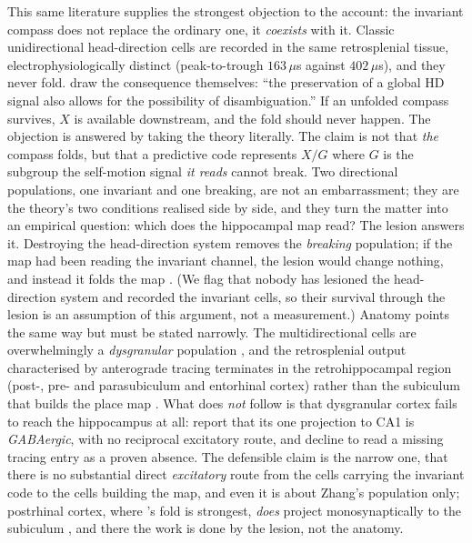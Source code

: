 This same literature supplies the strongest objection to the account: the invariant compass does not
replace the ordinary one, it \emph{coexists} with it. Classic unidirectional head-direction cells are
recorded in the same retrosplenial tissue, electrophysiologically distinct (peak-to-trough $163\,\mu$s
against $402\,\mu$s), and they never fold. \citet{zhang2022} draw the consequence themselves: ``the
preservation of a global HD signal also allows for the possibility of disambiguation.'' If an unfolded
compass survives, $X$ is available downstream, and the fold should never happen. The objection is
answered by taking the theory literally. The claim is not that \emph{the} compass folds, but that a
predictive code represents $X/G$ where $G$ is the subgroup the self-motion signal \emph{it reads} cannot
break. Two directional populations, one invariant and one breaking, are not an embarrassment; they are
the theory's two conditions realised side by side, and they turn the matter into an empirical question:
which does the hippocampal map read? The lesion answers it. Destroying the head-direction system removes
the \emph{breaking} population; if the map had been reading the invariant channel, the lesion would
change nothing, and instead it folds the map \citep{harland2017}. (We flag that nobody has lesioned the
head-direction system and recorded the invariant cells, so their survival through the lesion is an
assumption of this argument, not a measurement.) Anatomy points the same way but must be stated
narrowly. The multidirectional cells are overwhelmingly a \emph{dysgranular} population
\citep[$76\%$;][]{zhang2022}, and the retrosplenial output characterised by anterograde tracing
terminates in the retrohippocampal region (post-, pre- and parasubiculum and entorhinal cortex)
rather than the subiculum that builds the place map \citep{shibata1994, vangroen1992}. What does
\emph{not} follow is that dysgranular cortex fails to reach the hippocampus at all: \citet{li2025} report
that its one projection to CA1 is \emph{GABAergic}, with no reciprocal excitatory route, and
\citet{sugar2011} decline to read a missing tracing entry as a proven absence. The defensible claim is
the narrow one, that there is no substantial direct \emph{excitatory} route from the cells carrying the
invariant code to the cells building the map, and even it is about Zhang's population only; postrhinal
cortex,
where \citeauthor{lachance2024}'s fold is strongest, \emph{does} project monosynaptically to the
subiculum \citep{naber2001}, and there the work is done by the lesion, not the anatomy.

